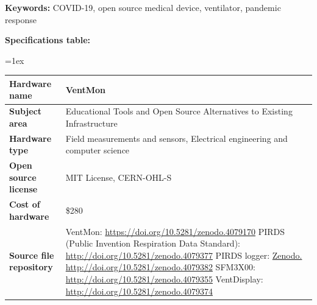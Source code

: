 \documentclass[11pt, letterpaper]{article}
\begin{document}
\begin{flushleft}
\textbf{Keywords:} COVID-19, open source medical device, ventilator, pandemic response

\newpage
\textbf{Specifications table:}

\tabulinesep=1ex
\begin{tabu} to \linewidth {|X|X[3,l]|}
\hline  \textbf{Hardware name} &
  VentMon
  \\
  \hline \textbf{Subject area} & %
 Educational Tools and Open Source Alternatives to Existing Infrastructure
  \\
  \hline \textbf{Hardware type} &
Field measurements and sensors,
Electrical engineering and computer science
  \\
\hline \textbf{Open source license} &
 MIT License, CERN-OHL-S
  \\
\hline \textbf{Cost of hardware} &
\$280
  \\
  \hline \textbf{Source file repository} &

  VentMon: \linebreak
  \href{https://doi.org/10.5281/zenodo.4079170}{https://doi.org/10.5281/zenodo.4079170}
  \linebreak
  PIRDS (Public Invention Respiration Data Standard): \linebreak
  \href{http://doi.org/10.5281/zenodo.4079377}{http://doi.org/10.5281/zenodo.4079377}
  \linebreak
  PIRDS logger: \linebreak
  \href{Zenodo. http://doi.org/10.5281/zenodo.4079382}{Zenodo. http://doi.org/10.5281/zenodo.4079382}
  \linebreak
  SFM3X00: \linebreak
  \href{http://doi.org/10.5281/zenodo.4079355}{http://doi.org/10.5281/zenodo.4079355} \linebreak
  VentDisplay: \linebreak
  \href{http://doi.org/10.5281/zenodo.4079374}{http://doi.org/10.5281/zenodo.4079374} \linebreak
  \linebreak


\end{tabu}
\end{flushleft}
\end{document}

